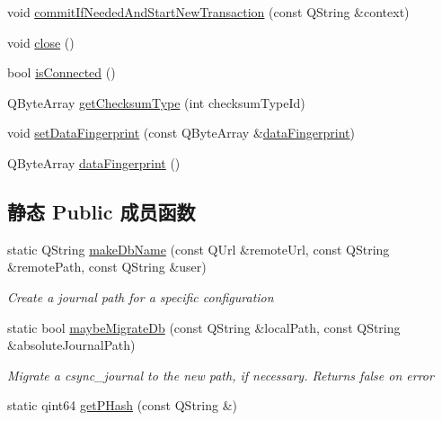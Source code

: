 \begin{DoxyCompactItemize}
\item 
void \hyperlink{class_o_c_c_1_1_sync_journal_db_ad975c5079cb5539b184f4d32424b2e7e}{commit\+If\+Needed\+And\+Start\+New\+Transaction} (const Q\+String \&context)
\item 
void \hyperlink{class_o_c_c_1_1_sync_journal_db_ad461815eba053b872d0b1228aa878438}{close} ()
\item 
bool \hyperlink{class_o_c_c_1_1_sync_journal_db_af8aad831c9b88a6f7b94679052b609c6}{is\+Connected} ()
\item 
Q\+Byte\+Array \hyperlink{class_o_c_c_1_1_sync_journal_db_ac8137d253a83ed1da2668ea5304bfc6b}{get\+Checksum\+Type} (int checksum\+Type\+Id)
\item 
void \hyperlink{class_o_c_c_1_1_sync_journal_db_a7ce0cd84162e54d80d4b702dad8bc741}{set\+Data\+Fingerprint} (const Q\+Byte\+Array \&\hyperlink{class_o_c_c_1_1_sync_journal_db_a98354870e6087206a9cf78cc1ee67d63}{data\+Fingerprint})
\item 
Q\+Byte\+Array \hyperlink{class_o_c_c_1_1_sync_journal_db_a98354870e6087206a9cf78cc1ee67d63}{data\+Fingerprint} ()
\end{DoxyCompactItemize}
\subsection*{静态 Public 成员函数}
\begin{DoxyCompactItemize}
\item 
static Q\+String \hyperlink{class_o_c_c_1_1_sync_journal_db_a74484fe7189b49c70d9ee04c53cfa198}{make\+Db\+Name} (const Q\+Url \&remote\+Url, const Q\+String \&remote\+Path, const Q\+String \&user)
\begin{DoxyCompactList}\small\item\em Create a journal path for a specific configuration \end{DoxyCompactList}\item 
static bool \hyperlink{class_o_c_c_1_1_sync_journal_db_af2385a1c48b7890187404a190f3a31f7}{maybe\+Migrate\+Db} (const Q\+String \&local\+Path, const Q\+String \&absolute\+Journal\+Path)
\begin{DoxyCompactList}\small\item\em Migrate a csync\+\_\+journal to the new path, if necessary. Returns false on error \end{DoxyCompactList}\item 
static qint64 \hyperlink{class_o_c_c_1_1_sync_journal_db_a134fb865751cbb37dfbf67977c5e58b5}{get\+P\+Hash} (const Q\+String \&)
\end{DoxyCompactItemize}


